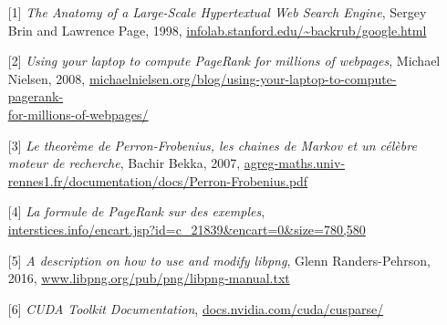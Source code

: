 \documentclass[a4paper,12pt]{article}
\begin{document}
\begin{itemize}
  \item[{[1]}] \textit{The Anatomy of a Large-Scale Hypertextual Web Search Engine}, Sergey Brin and Lawrence Page, 1998, \url{infolab.stanford.edu/~backrub/google.html}
  \bigskip
  \item[{[2]}] \textit{Using your laptop to compute PageRank for millions of webpages}, Michael Nielsen, 2008, \url{michaelnielsen.org/blog/using-your-laptop-to-compute-pagerank-}\\\url{for-millions-of-webpages/}
  \bigskip
  \item[{[3]}] \textit{Le theorème de Perron-Frobenius, les chaines de Markov et un célèbre moteur de recherche}, Bachir Bekka, 2007, \url{agreg-maths.univ-rennes1.fr/documentation/docs/Perron-Frobenius.pdf}
  \bigskip
  \item[{[4]}] \textit{La formule de PageRank sur des exemples}, \\\url{interstices.info/encart.jsp?id=c_21839&encart=0&size=780,580}
  \bigskip
  \item[{[5]}] \textit{A description on how to use and modify libpng}, Glenn Randers-Pehrson, 2016, \url{www.libpng.org/pub/png/libpng-manual.txt}
  \bigskip
  \item[{[6]}] \textit{CUDA Toolkit Documentation}, \url{docs.nvidia.com/cuda/cusparse/}
\end{itemize}
\end{document}
